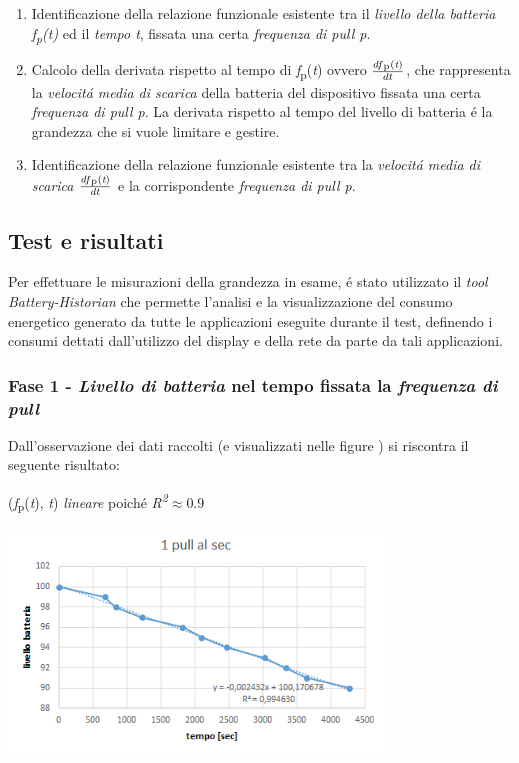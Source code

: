 \documentclass{article}
\begin{document}
\begin{enumerate}
\item{Identificazione della relazione funzionale esistente tra il \textit{livello della batteria \textit{f}\textsubscript{p}(\textit{t})} ed il \textit{tempo t}, fissata una certa \textit{frequenza di pull p}.}
\item{Calcolo della derivata rispetto al tempo di \textit{f}\textsubscript{p}(\textit{t}) ovvero \(\frac{df\textsubscript{p}(\textit{t})}{dt}\), che rappresenta la \textit{velocit\'a media di scarica} della batteria del dispositivo fissata una certa \textit{frequenza di pull p}. La derivata rispetto al tempo del livello di batteria \'e la grandezza che si vuole limitare e gestire.}
\item{Identificazione della relazione funzionale esistente tra la \textit{velocit\'a media di scarica \(\frac{df\textsubscript{p}(\textit{t})}{dt}\)} e la corrispondente \textit{frequenza di pull p}.}
\end{enumerate} 

\subsection{Test e risultati}

Per effettuare le misurazioni della grandezza in esame, \'e stato utilizzato il \textit{tool Battery-Historian} che permette l'analisi e la visualizzazione del consumo energetico generato da tutte le applicazioni eseguite durante il test, definendo i consumi dettati dall'utilizzo del display e della rete da parte da tali applicazioni.

\subsubsection{Fase 1 - \textit{Livello di batteria} nel tempo fissata la \textit{frequenza di pull}}
Dall'osservazione dei dati raccolti (e visualizzati nelle figure ) si riscontra il seguente risultato:

\begin{center}
(\textit{f}\textsubscript{p}(\textit{t}), \textit{t})  \textit{lineare} poich\'e \textit{R\textsuperscript{2}}\(\approx\)0.9
\end{center}
\begin{center}
\includegraphics[width=0.75\textwidth]{1alsec.jpg} %
\label{fig:1 pull ogni secondo}
\end{center}
\end{document}
